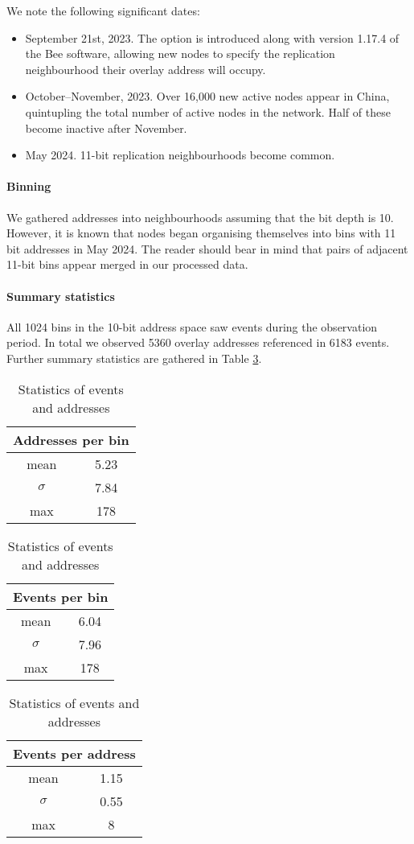 We note the following significant dates:
\begin{itemize}
  \item September 21st, 2023. The  option is introduced along with version 1.17.4 of the Bee software, allowing new nodes to specify the replication neighbourhood their overlay address will occupy.
  \item October--November, 2023. Over 16,000 new active nodes appear in China, quintupling the total number of active nodes in the network. Half of these become inactive after November.
  \item May 2024. 11-bit replication neighbourhoods become common.
\end{itemize}


\paragraph{Binning} We gathered addresses into neighbourhoods assuming that the bit depth is 10.
%
However, it is known that nodes began organising themselves into bins with 11 bit addresses in May 2024.
%
The reader should bear in mind that pairs of adjacent 11-bit bins appear merged in our processed data.

\paragraph{Summary statistics}
All 1024 bins in the 10-bit address space saw events during the observation period.
%
In total we observed 5360 overlay addresses referenced in 6183 events. 
%
Further summary statistics are gathered in Table \ref{event-statistics}.

\begin{table} 
  \hfill
  \begin{tabular}{cc}
    \multicolumn{2}{l}{Addresses per bin} \\
    \toprule 
    mean      & 5.23 \\
    $\sigma$  & 7.84 \\
    max       & 178 \\
    \bottomrule
  \end{tabular}
  \hfill
  \begin{tabular}{cc}
    \multicolumn{2}{l}{Events per bin} \\
    \toprule 
    mean      & 6.04 \\
    $\sigma$  & 7.96 \\
    max       & 178 \\
    \bottomrule
  \end{tabular}
  \hfill
  \begin{tabular}{cc}
    \multicolumn{2}{l}{Events per address}\\
    \toprule
    mean      & 1.15 \\
    $\sigma$  & 0.55 \\
    max       & 8  \\
    \bottomrule
  \end{tabular}
  \hfill
  \caption{
    Statistics of events and addresses
  }
  \label{event-statistics}
\end{table}

